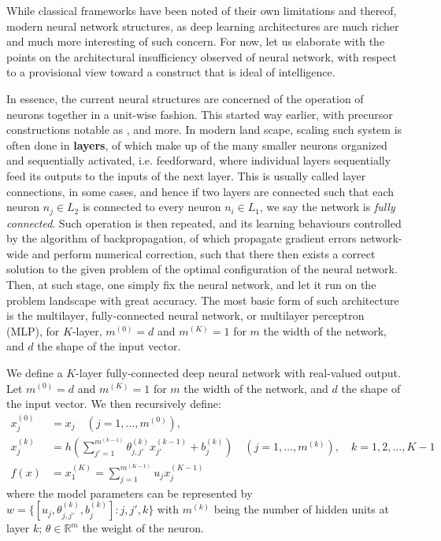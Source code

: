 While classical frameworks have been noted of their own limitations and thereof, modern neural network structures, as deep learning architectures are much richer and much more interesting of such concern. For now, let us elaborate with the points on the architectural insufficiency observed of neural network, with respect to a provisional view toward a construct that is ideal of intelligence. 

In essence, the current neural structures are concerned of the operation of neurons together in a unit-wise fashion. This started way earlier, with precursor constructions notable as \cite{Rosenblatt1958ThePA,mcculloch_logical_1943}, and more. In modern land scape, scaling such system is often done in \textbf{layers}, of which make up of the many smaller neurons organized and sequentially activated, i.e. feedforward, where individual layers sequentially feed its outputs to the inputs of the next layer. This is usually called layer connections, in some cases, and hence if two layers are connected such that each neuron $n_{j}\in L_{2}$ is connected to every neuron $n_{i}\in L_{1}$, we say the network is \textit{fully connected}. Such operation is then repeated, and its learning behaviours controlled by the algorithm of backpropagation, of which propagate gradient errors network-wide and perform numerical correction, such that there then exists a correct solution to the given problem of the optimal configuration of the neural network. Then, at such stage, one simply fix the neural network, and let it run on the problem landscape with great accuracy. The most basic form of such architecture is the multilayer, fully-connected neural network, or multilayer perceptron (MLP), for $K$-layer, $m^{(0)}=d$ and $m^{(K)}=1$ for $m$ the width of the network, and $d$ the shape of the input vector.

\begin{definition}\label{def:SMLP}
    We define a $K$-layer fully-connected deep neural network with real-valued output. Let $m^{(0)}=d$ and $m^{(K)}=1$ for $m$ the width of the network, and $d$ the shape of the input vector. We then recursively define: 
\begin{align}
    x_{j}^{(0)} &= x_{j} \quad (j=1,\dots,m^{(0)}),\\ 
    x_{j}^{(k)} &= h\left(\sum^{m^{(k-1)}}_{j'=1} \theta_{j,j'}^{(k)}x_{j'}^{(k-1)}+ b_{j}^{(k)}\right)\quad (j=1,\dots,m^{(k)}), \quad k = 1,2,\dots,K-1\\
    f(x) & = x_{1}^{(K)} = \sum^{m^{(K-1)}}_{j=1} u_{j}x_{j}^{(K-1)}
\end{align}
where the model parameters can be represented by $w=\{[u_{j}, \theta_{j,j'}^{(k)}, b_{j}^{(k)}]: j,j',k\}$ with $m^{(k)}$ being the number of hidden units at layer $k$; $\theta\in \mathbb{R}^{m}$ the weight of the neuron.
\end{definition}

